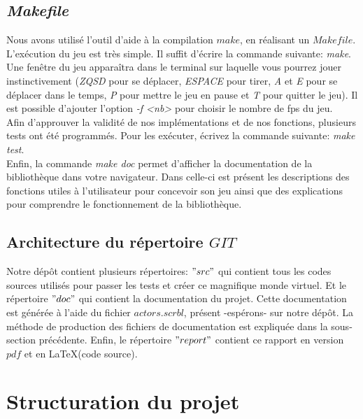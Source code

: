 \documentclass{article}
\begin{document}
    \subsection{\textit{Makefile}}
Nous avons utilisé l'outil d'aide à la compilation \textbf{$make$}, en réalisant un \textbf{$Makefile$}.
L'exécution du jeu est très simple. Il suffit d'écrire la commande suivante:
\textit{make}. Une fenêtre du jeu apparaîtra dans le terminal sur laquelle vous pourrez jouer instinctivement (\textit{ZQSD} pour se déplacer, \textit{ESPACE} pour tirer, \textit{A} et \textit{E} pour se déplacer dans le temps, \textit{P} pour mettre le jeu en pause et \textit{T} pour quitter le jeu). Il est possible d'ajouter l'option \textit{-f <nb>} pour choisir le nombre de fps du jeu.
\\ Afin d'approuver la validité de nos implémentations et de nos fonctions, plusieurs tests ont été programmés. Pour les exécuter, écrivez la commande suivante: 
\textit{make test}. \\ Enfin, la commande \textit{make doc} permet d'afficher la documentation de la bibliothèque dans votre navigateur. Dans celle-ci est présent les descriptions des fonctions utiles à l'utilisateur pour concevoir son jeu ainsi que des explications pour comprendre le fonctionnement de la bibliothèque.

    \subsection{Architecture du répertoire $GIT$}
    Notre dépôt contient plusieurs répertoires: $"src"$ qui contient tous les codes sources utilisés pour passer les tests et créer ce magnifique monde virtuel. Et le répertoire $"doc"$ qui contient la documentation du projet.
    Cette documentation est générée à l'aide du fichier $actors.scrbl$, présent -espérons- sur notre dépôt. La méthode de production des fichiers de documentation est expliquée dans la sous-section précédente. Enfin, le répertoire $"report"$ contient ce rapport en version $pdf$ et en \LaTeX (code source).

\newpage

\section{Structuration du projet}
\end{document}
